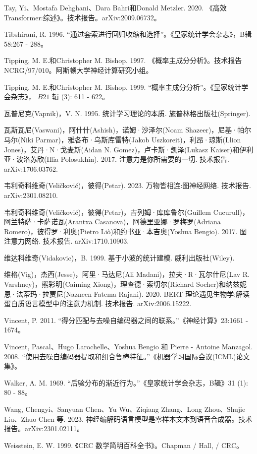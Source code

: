 \documentclass[10pt]{report}
\begin{document}
Tay, Yi、Mostafa Dehghani、Dara Bahri和Donald Metzler. 2020. 《高效Transformer:综述》。技术报告。arXiv:2009.06732。

Tibshirani, R. 1996. “通过套索进行回归收缩和选择”。《皇家统计学会杂志》，B辑 58:267 - 288。

Tipping, M. E.和Christopher M. Bishop. 1997. 《概率主成分分析》。技术报告NCRG/97/010。阿斯顿大学神经计算研究小组。

Tipping, M. E.和Christopher M. Bishop. 1999. “概率主成分分析”。《皇家统计学会杂志》， \({B21}\) 辑 (3): 611 - 622。

瓦普尼克(Vapnik)，V. N. 1995. 统计学习理论的本质. 施普林格出版社(Springer).

瓦斯瓦尼(Vaswani)，阿什什(Ashish)，诺姆·沙泽尔(Noam Shazeer)，尼基·帕尔马尔(Niki Parmar)，雅各布·乌斯库雷特(Jakob Uszkoreit)，利昂·琼斯(Llion Jones)，艾丹·N·戈麦斯(Aidan N. Gomez)，卢卡斯·凯泽(Lukasz Kaiser)和伊利亚·波洛苏欣(Illia Polosukhin). 2017. 注意力是你所需要的一切. 技术报告. arXiv:1706.03762.

韦利奇科维奇(Veličković)，彼得(Petar). 2023. 万物皆相连:图神经网络. 技术报告. arXiv:2301.08210.

韦利奇科维奇(Veličković)，彼得(Petar)，吉列姆·库库鲁尔(Guillem Cucurull)，阿兰特萨·卡萨诺瓦(Arantxa Casanova)，阿德里亚娜·罗梅罗(Adriana Romero)，彼得罗·利奥(Pietro Liò)和约书亚·本吉奥(Yoshua Bengio). 2017. 图注意力网络. 技术报告. arXiv:1710.10903.

维达科维奇(Vidakovic)，B. 1999. 基于小波的统计建模. 威利出版社(Wiley).

维格(Vig)，杰西(Jesse)，阿里·马达尼(Ali Madani)，拉夫·R·瓦尔什尼(Lav R. Varshney)，熊彩明(Caiming Xiong)，理查德·索切尔(Richard Socher)和纳兹妮恩·法蒂玛·拉贾尼(Nazneen Fatema Rajani). 2020. BERT 理论遇见生物学:解读蛋白质语言模型中的注意力机制. 技术报告. arXiv:2006.15222.

Vincent, P. 2011. “得分匹配与去噪自编码器之间的联系。”《神经计算》23:1661 - 1674。

Vincent, Pascal、Hugo Larochelle、Yoshua Bengio 和 Pierre - Antoine Manzagol. 2008. “使用去噪自编码器提取和组合鲁棒特征。”《机器学习国际会议(ICML)论文集》。

Walker, A. M. 1969. “后验分布的渐近行为。”《皇家统计学会杂志，B辑》31 (1): 80 - 88。

Wang, Chengyi、Sanyuan Chen、Yu Wu、Ziqiang Zhang、Long Zhou、Shujie Liu、Zhuo Chen 等. 2023. 神经编解码语言模型是零样本文本到语音合成器。技术报告。arXiv:2301.02111。

Weisstein, E. W. 1999. 《CRC 数学简明百科全书》。Chapman / Hall, / CRC。
\end{document}
